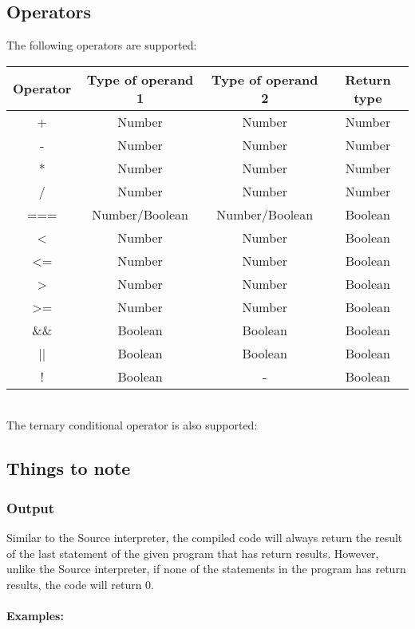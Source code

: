 \subsection{Operators}
The following operators are supported: 
\begin{center}
  \begin{tabular}{|c | c | c | c|} 
   \hline
   Operator & Type of operand 1 & Type of operand 2 & Return type \\ 
   \hline\hline
   + & Number & Number & Number \\ 
   \hline
   - & Number & Number & Number \\ 
   \hline
   * & Number & Number & Number \\ 
   \hline
   / & Number & Number & Number \\ 
   \hline
   === & Number/Boolean & Number/Boolean & Boolean \\ 
   \hline
   < & Number & Number & Boolean \\ 
   \hline
   <= & Number & Number & Boolean \\ 
   \hline
   > & Number & Number & Boolean \\ 
   \hline
   >= & Number & Number & Boolean \\ 
   \hline
   \&\& & Boolean & Boolean & Boolean \\ 
   \hline
   || & Boolean & Boolean & Boolean \\ 
   \hline
   ! & Boolean & - & Boolean \\ 
   \hline
  \end{tabular}
\end{center}
\\
The ternary conditional operator is also supported: \\

\subsection{Things to note}
\subsubsection{Output}
Similar to the Source interpreter, the compiled code will always return the result of the last statement of the given program that has return results. However, unlike the Source interpreter, if none of the statements in the program has return results, the code will return 0. 
\\\\
\textbf{Examples:} \\\\
 \\
\\
 \\
\\

